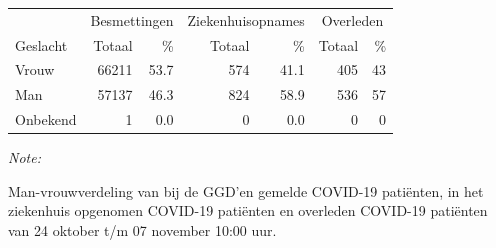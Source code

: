 \documentclass[
  english,
  man,floatsintext]{apa6}
\begin{document}
\begin{table}[H]
\centering\begingroup\fontsize{11}{13}\selectfont

\begin{threeparttable}
\begin{tabular}{lrrrrrr}
\toprule
\multicolumn{1}{c}{ } & \multicolumn{2}{c}{Besmettingen} & \multicolumn{2}{c}{Ziekenhuisopnames} & \multicolumn{2}{c}{Overleden} \\
\cmidrule(l{3pt}r{3pt}){2-3} \cmidrule(l{3pt}r{3pt}){4-5} \cmidrule(l{3pt}r{3pt}){6-7}
Geslacht & Totaal & \% & Totaal & \% & Totaal & \%\\
\midrule
Vrouw & 66211 & 53.7 & 574 & 41.1 & 405 & 43\\
Man & 57137 & 46.3 & 824 & 58.9 & 536 & 57\\
Onbekend & 1 & 0.0 & 0 & 0.0 & 0 & 0\\
\bottomrule
\end{tabular}
\begin{tablenotes}
\item \textit{Note: } 
\item Man-vrouwverdeling van bij de GGD’en gemelde COVID-19 patiënten, in het ziekenhuis opgenomen COVID-19 patiënten en overleden COVID-19 patiënten van 24 oktober t/m 07 november 10:00 uur.
\end{tablenotes}
\end{threeparttable}
\endgroup{}
\end{table}
\newpage
\end{document}
